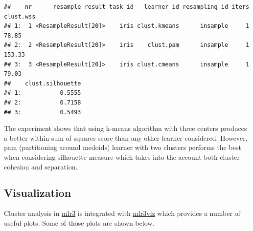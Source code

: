 \documentclass[
]{scrbook}
\newenvironment{Shaded}{\begin{snugshade}}{\end{snugshade}}
\newcommand{\AttributeTok}[1]{\textcolor[rgb]{0.77,0.63,0.00}{#1}}
\newcommand{\CommentTok}[1]{\textcolor[rgb]{0.56,0.35,0.01}{\textit{#1}}}
\newcommand{\DecValTok}[1]{\textcolor[rgb]{0.00,0.00,0.81}{#1}}
\newcommand{\FunctionTok}[1]{\textcolor[rgb]{0.00,0.00,0.00}{#1}}
\newcommand{\NormalTok}[1]{#1}
\newcommand{\OtherTok}[1]{\textcolor[rgb]{0.56,0.35,0.01}{#1}}
\newcommand{\SpecialCharTok}[1]{\textcolor[rgb]{0.00,0.00,0.00}{#1}}
\newcommand{\StringTok}[1]{\textcolor[rgb]{0.31,0.60,0.02}{#1}}
\renewenvironment{Shaded} {\begin{snugshade}\small} {\end{snugshade}}
\begin{document}
\begin{Shaded}
\end{Shaded}

\begin{verbatim}
##    nr      resample_result task_id   learner_id resampling_id iters clust.wss
## 1:  1 <ResampleResult[20]>    iris clust.kmeans      insample     1     78.85
## 2:  2 <ResampleResult[20]>    iris    clust.pam      insample     1    153.33
## 3:  3 <ResampleResult[20]>    iris clust.cmeans      insample     1     79.03
##    clust.silhouette
## 1:           0.5555
## 2:           0.7158
## 3:           0.5493
\end{verbatim}

The experiment shows that using k-means algorithm with three centers produces a better within sum of squares score than any other learner considered. However, pam (partitioning around medoids) learner with two clusters performs the best when considering silhouette measure which takes into the account both cluster cohesion and separation.

\hypertarget{visualization}{%
\subsection{Visualization}\label{visualization}}

Cluster analysis in \href{https://mlr3.mlr-org.com}{mlr3} is integrated with \href{https://mlr3viz.mlr-org.com}{mlr3viz} which provides a number of useful plots. Some of those plots are shown below.

\begin{Shaded}
\end{Shaded}
\end{document}
